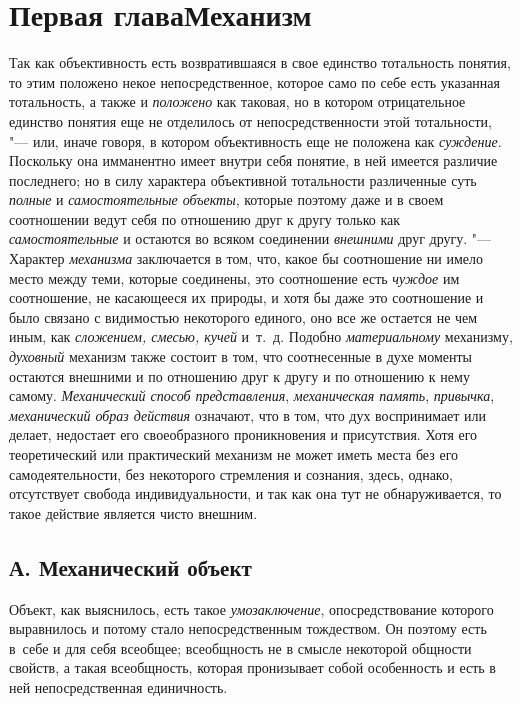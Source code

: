 \chapter[Первая глава Механизм]{Первая глава\newline Механизм}
Так как объективность есть возвратившаяся в свое единство
тотальность понятия, то этим положено некое непосредственное, которое само
по себе есть указанная тотальность, а также и {\em положено} как
таковая, но в котором отрицательное единство понятия еще не отделилось от
непосредственности этой тотальности, "--- или, иначе говоря, в
котором объективность еще не положена как {\em суждение}. Поскольку
она имманентно имеет внутри себя понятие, в ней имеется различие
последнего; но в силу характера объективной тотальности различенные суть
{\em полные} и {\em самостоятельные объекты},
которые поэтому даже и в своем соотношении ведут себя по
отношению друг к другу только как {\em самостоятельные} и
остаются во всяком соединении {\em внешними} друг другу. "--- Характер
{\em механизма} заключается в том, что, какое бы соотношение ни имело место
между теми, которые соединены, это соотношение есть {\em чуждое} им
соотношение, не касающееся их природы, и хотя бы даже это соотношение и
было связано с видимостью некоторого единого, оно все же остается не чем
иным, как {\em сложением, смесью, кучей} и~т.~д. Подобно {\em материальному}
механизму, {\em духовный}
механизм также состоит в том, что соотнесенные в духе моменты
остаются внешними и по отношению друг к другу и по отношению к нему самому.
{\em Механический способ представления}, {\em механическая
память}, {\em привычка}, {\em механический образ действия} означают, что в
том, что дух воспринимает или делает, недостает его
своеобразного проникновения и присутствия. Хотя его
теоретический или практический механизм не может иметь места без его
самодеятельности, без некоторого стремления и сознания, здесь, однако,
отсутствует свобода индивидуальности, и так как она тут не обнаруживается,
то такое действие является чисто внешним.

\section[А. Механический объект]{А. Механический объект}
Объект, как выяснилось, есть такое {\em умозаключение},
опосредствование которого выравнилось и потому стало непосредственным
тождеством. Он поэтому есть в~себе и для себя всеобщее; всеобщность не в
смысле некоторой общности свойств, а такая всеобщность, которая пронизывает
собой особенность и есть в ней непосредственная единичность.

